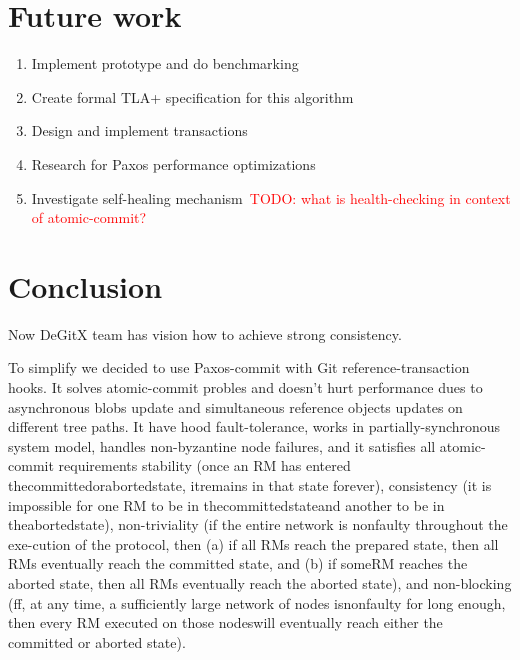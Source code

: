 \documentclass[acmlarge, screen, nonacm]{acmart}
\newcommand{\todo}[1]{\textcolor{red}{TODO: #1}}
\begin{document}
\section{Future work}

\begin{enumerate}
  \item Implement prototype and do benchmarking
  \item Create formal TLA+ specification for this algorithm
  \item Design and implement transactions
  \item Research for Paxos performance optimizations
  \item Investigate self-healing mechanism~\todo{what is health-checking in context of atomic-commit?}
\end{enumerate}

\section{Conclusion}

Now DeGitX team has vision how to achieve strong consistency.

To simplify we decided to use Paxos-commit with Git reference-transaction hooks.
It solves atomic-commit probles and doesn't hurt performance dues to asynchronous blobs update
and simultaneous reference objects updates on different tree paths.
It have hood fault-tolerance, works in partially-synchronous system model,
handles non-byzantine node failures, and it satisfies all atomic-commit requirements
stability (once an RM has entered thecommittedorabortedstate, itremains in that state forever),
consistency (it is impossible for one RM to be in thecommittedstateand another to be in theabortedstate),
non-triviality (if the entire network is nonfaulty throughout the exe-cution of the protocol,
then (a) if all RMs reach the prepared state, then all RMs eventually reach the committed state,
and (b) if someRM reaches the aborted state,  then all RMs eventually reach the aborted state),
and non-blocking (ff, at any time, a sufficiently large network of nodes isnonfaulty for long enough,
then every RM executed on those nodeswill eventually reach either the committed or aborted state).

\newpage



\end{document}
